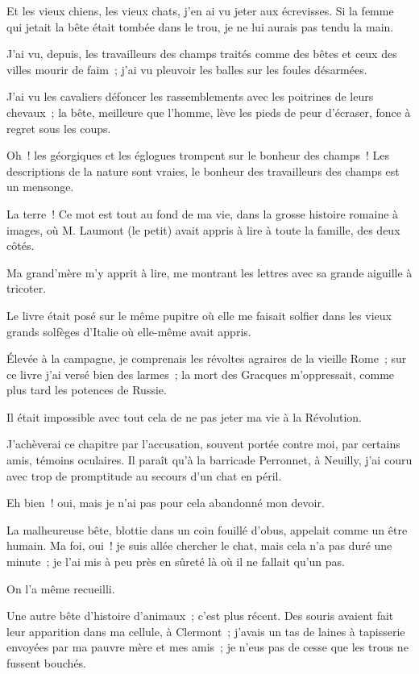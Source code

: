 \documentclass[french,twoside]{book} %
\begin{document}
Et les vieux chiens, les vieux chats, j’en ai vu jeter aux écrevisses. Si la femme qui jetait la bête était tombée dans le trou, je ne lui aurais pas tendu la main.\par
J’ai vu, depuis, les travailleurs des champs traités comme des bêtes et ceux des villes mourir de faim ; j’ai vu pleuvoir les balles sur les foules désarmées.\par
J’ai vu les cavaliers défoncer les rassemblements avec les poitrines de leurs chevaux ; la bête, meilleure que l’homme, lève les pieds de peur d’écraser, fonce à regret sous les coups.\par
Oh ! les géorgiques et les églogues trompent sur le bonheur des champs ! Les descriptions de la nature sont vraies, le bonheur des travailleurs des champs est un mensonge.\par
La terre ! Ce mot est tout au fond de ma vie, dans la grosse histoire romaine à images, où M. Laumont (le petit) avait appris à lire à toute la famille, des deux côtés.\par
 Ma grand’mère m’y apprit à lire, me montrant les lettres avec sa grande aiguille à tricoter.\par
Le livre était posé sur le même pupitre où elle me faisait solfier dans les vieux grands solfèges d’Italie où elle-même avait appris.\par
Élevée à la campagne, je comprenais les révoltes agraires de la vieille Rome ; sur ce livre j’ai versé bien des larmes ; la mort des Gracques m’oppressait, comme plus tard les potences de Russie.\par
Il était impossible avec tout cela de ne pas jeter ma vie à la Révolution.\par
J’achèverai ce chapitre par l’accusation, souvent portée contre moi, par certains amis, témoins oculaires. Il paraît qu’à la barricade Perronnet, à Neuilly, j’ai couru avec trop de promptitude au secours d’un chat en péril.\par
Eh bien ! oui, mais je n’ai pas pour cela abandonné mon devoir.\par
La malheureuse bête, blottie dans un coin fouillé d’obus, appelait comme un être humain. Ma foi, oui ! je suis allée chercher le chat, mais cela n’a pas duré une minute ; je l’ai mis à peu près en sûreté là où il ne fallait qu’un pas.\par
On l’a même recueilli.\par
Une autre bête d’histoire d’animaux ; c’est plus récent. Des souris avaient fait leur apparition  dans ma cellule, à Clermont ; j’avais un tas de laines à tapisserie envoyées par ma pauvre mère et mes amis ; je n’eus pas de cesse que les trous ne fussent bouchés.\par
\end{document}
